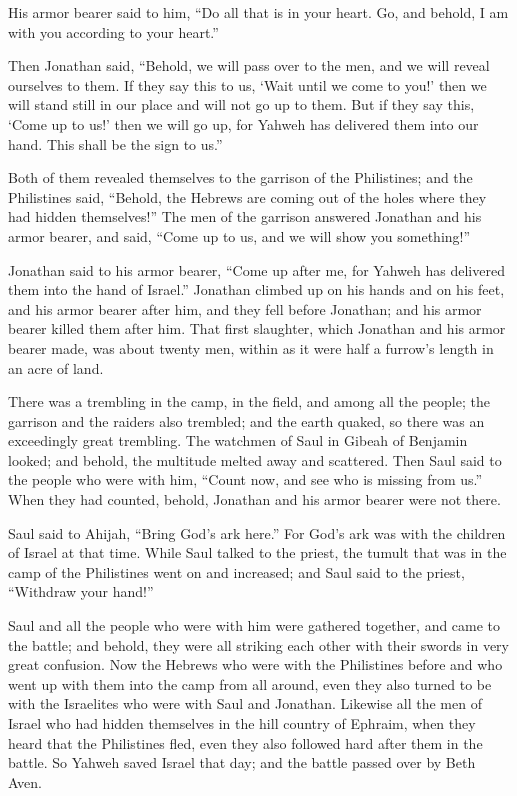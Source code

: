  His armor bearer said to him, ``Do all that is in your
heart. Go, and behold, I am with you according to your heart.''

 Then Jonathan said, ``Behold, we will pass over to the men,
and we will reveal ourselves to them.  If they say this to
us, `Wait until we come to you!' then we will stand still in our place
and will not go up to them.  But if they say this, `Come up
to us!' then we will go up, for Yahweh has delivered them into our hand.
This shall be the sign to us.''

 Both of them revealed themselves to the garrison of the
Philistines; and the Philistines said, ``Behold, the Hebrews are coming
out of the holes where they had hidden themselves!''  The
men of the garrison answered Jonathan and his armor bearer, and said,
``Come up to us, and we will show you something!''

Jonathan said to his armor bearer, ``Come up after me, for Yahweh has
delivered them into the hand of Israel.''  Jonathan climbed
up on his hands and on his feet, and his armor bearer after him, and
they fell before Jonathan; and his armor bearer killed them after him.
 That first slaughter, which Jonathan and his armor bearer
made, was about twenty men, within as it were half a furrow's length in
an acre of land.

 There was a trembling in the camp, in the field, and among
all the people; the garrison and the raiders also trembled; and the
earth quaked, so there was an exceedingly great trembling. 
The watchmen of Saul in Gibeah of Benjamin looked; and behold, the
multitude melted away and scattered.  Then Saul said to the
people who were with him, ``Count now, and see who is missing from us.''
When they had counted, behold, Jonathan and his armor bearer were not
there.

 Saul said to Ahijah, ``Bring God's ark here.'' For God's
ark was with the children of Israel at that time.  While
Saul talked to the priest, the tumult that was in the camp of the
Philistines went on and increased; and Saul said to the priest,
``Withdraw your hand!''

 Saul and all the people who were with him were gathered
together, and came to the battle; and behold, they were all striking
each other with their swords in very great confusion.  Now
the Hebrews who were with the Philistines before and who went up with
them into the camp from all around, even they also turned to be with the
Israelites who were with Saul and Jonathan.  Likewise all
the men of Israel who had hidden themselves in the hill country of
Ephraim, when they heard that the Philistines fled, even they also
followed hard after them in the battle.  So Yahweh saved
Israel that day; and the battle passed over by Beth Aven.

